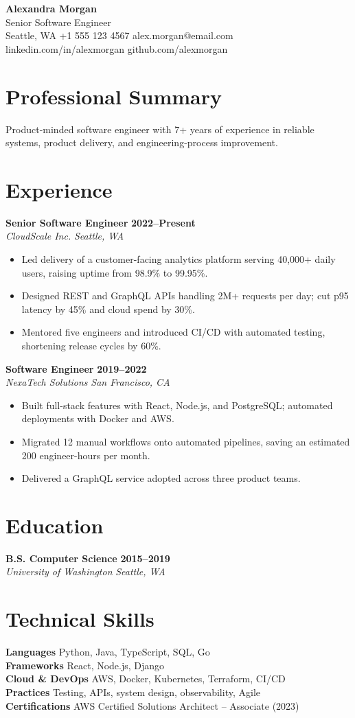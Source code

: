 \documentclass[10pt,letterpaper]{article}
\newcommand{\cvitem}[2]{\noindent\textbf{#1} \hfill {\small #2}\\[1pt]}
\newcommand{\cventry}[5]{\noindent\textbf{#2} \hfill \textbf{#1}\\[1pt]\textit{#3} \hfill \textit{#4}\\[2pt]}
\begin{document}
\begin{center}{\fontsize{24}{28}\selectfont\bfseries Alexandra Morgan}\\[2pt]
{\large\color{modernblue} Senior Software Engineer}\\[4pt]
\small Seattle, WA \textbar{} +1 555 123 4567 \textbar{} alex.morgan@email.com \textbar{} linkedin.com/in/alexmorgan \textbar{} github.com/alexmorgan
\end{center}
\vspace{6pt}

\section{Professional Summary}
\noindent Product-minded software engineer with 7+ years of experience in reliable systems, product delivery, and engineering-process improvement.

\section{Experience}
\cventry{2022--Present}{Senior Software Engineer}{CloudScale Inc.}{Seattle, WA}{}
\begin{itemize}
\item Led delivery of a customer-facing analytics platform serving 40,000+ daily users, raising uptime from 98.9\% to 99.95\%.
\item Designed REST and GraphQL APIs handling 2M+ requests per day; cut p95 latency by 45\% and cloud spend by 30\%.
\item Mentored five engineers and introduced CI/CD with automated testing, shortening release cycles by 60\%.
\end{itemize}
\vspace{5pt}
\cventry{2019--2022}{Software Engineer}{NexaTech Solutions}{San Francisco, CA}{}
\begin{itemize}
\item Built full-stack features with React, Node.js, and PostgreSQL; automated deployments with Docker and AWS.
\item Migrated 12 manual workflows onto automated pipelines, saving an estimated 200 engineer-hours per month.
\item Delivered a GraphQL service adopted across three product teams.
\end{itemize}
\vspace{5pt}

\section{Education}
\cventry{2015--2019}{B.S. Computer Science}{University of Washington}{Seattle, WA}{}

\section{Technical Skills}
\cvitem{Languages}{Python, Java, TypeScript, SQL, Go}
\cvitem{Frameworks}{React, Node.js, Django}
\cvitem{Cloud \& DevOps}{AWS, Docker, Kubernetes, Terraform, CI/CD}
\cvitem{Practices}{Testing, APIs, system design, observability, Agile}
\cvitem{Certifications}{AWS Certified Solutions Architect -- Associate (2023)}
\end{document}
